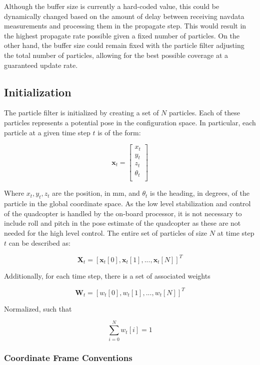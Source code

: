 		Although the buffer size is currently a hard-coded value, this could be dynamically changed based on the amount of delay between receiving navdata measurements and processing them in the propagate step. This would result in the highest propagate rate possible given a fixed number of particles. On the other hand, the buffer size could remain fixed with the particle filter adjusting the total number of particles, allowing for the best possible coverage at a guaranteed update rate.

	\subsection{Initialization}

		The particle filter is initialized by creating a set of $N$ particles. Each of these particles represents a potential pose in the configuration space. In particular, each particle at a given time step $t$ is of the form:

		\[\textbf{x}_t = \begin{bmatrix} 
			  x_t\\
			  y_t\\
			  z_t\\
			  \theta_t\\
			\end{bmatrix}	
		\]

		Where $x_t, y_t, z_t$ are the position, in mm, and $\theta_t$ is the heading, in degrees, of the particle in the global coordinate space. As the low level stabilization and control of the quadcopter is handled by the on-board processor, it is not necessary to include roll and pitch in the pose estimate of the quadcopter as these are not needed for the high level control. The entire set of particles of size $N$ at time step $t$ can be described as:

		\[
		\textbf{X}_t = [\textbf{x}_t[0], \textbf{x}_t[1],...,\textbf{x}_t[N]]^T
		\]

		Additionally, for each time step, there is a set of associated weights

		\[
		\textbf{W}_t = [w_t[0], w_t[1],...,w_t[N]]^T
		\]

		Normalized, such that

		\[
		\sum_{i=0}^N w_t[i] = 1
		\]


		\subsubsection{Coordinate Frame Conventions}

